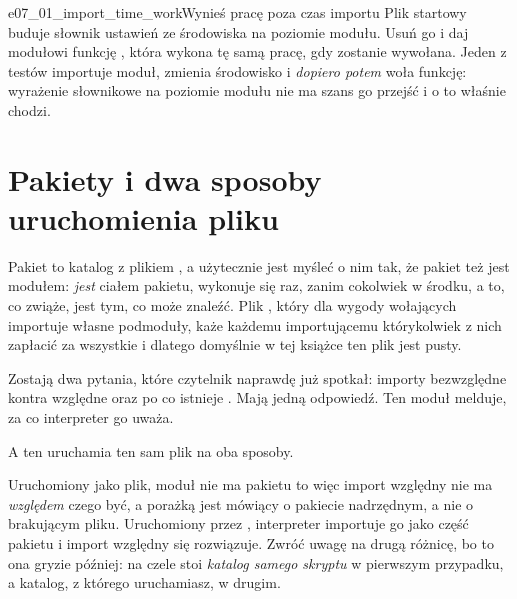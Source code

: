 \begin{exercise}{e07_01_import_time_work}{Wynieś pracę poza czas importu}
Plik startowy buduje słownik ustawień ze środowiska na poziomie modułu.
Usuń go i daj modułowi funkcję , która wykona tę
samą pracę, gdy zostanie wywołana. Jeden z testów importuje moduł, zmienia
środowisko i \emph{dopiero potem} woła funkcję: wyrażenie słownikowe na
poziomie modułu nie ma szans go przejść i o to właśnie chodzi.
\end{exercise}

\section{Pakiety i dwa sposoby uruchomienia pliku}
\label{sec:packages}

Pakiet to katalog z plikiem , a użytecznie jest myśleć
o nim tak, że pakiet też jest modułem:  \emph{jest}
ciałem pakietu, wykonuje się raz, zanim cokolwiek w środku, a to, co zwiąże,
jest tym, co  może znaleźć. Plik
, który dla wygody wołających importuje własne
podmoduły, każe każdemu importującemu którykolwiek z nich zapłacić za
wszystkie \dash{} i dlatego domyślnie w tej książce ten plik jest pusty.

Zostają dwa pytania, które czytelnik naprawdę już spotkał: importy
bezwzględne kontra względne oraz po co istnieje . Mają jedną
odpowiedź. Ten moduł melduje, za co interpreter go uważa.


\noindent
A ten uruchamia ten sam plik na oba sposoby.



\noindent
Uruchomiony jako plik, moduł nie ma pakietu \dash{} 
to  \dash{} więc import względny nie ma \emph{względem} czego
być, a porażką jest  mówiący o pakiecie nadrzędnym, a nie
o brakującym pliku. Uruchomiony przez , interpreter importuje go
jako część pakietu  i import względny się rozwiązuje. Zwróć
uwagę na drugą różnicę, bo to ona gryzie później: na czele 
stoi \emph{katalog samego skryptu} w pierwszym przypadku, a katalog, z
którego uruchamiasz, w drugim.

